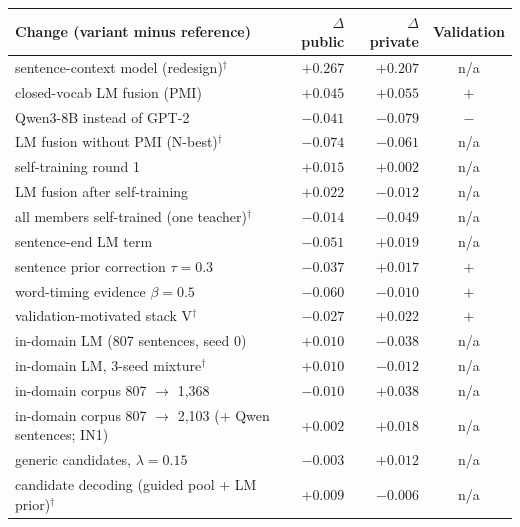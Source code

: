 \begin{tabular}{lrrc}
    \toprule
    Change (variant minus reference) & $\Delta$ public & $\Delta$ private & Validation \\
    \midrule
    sentence-context model (redesign)$^\dagger$ & $+0.267$ & $+0.207$ & n/a \\
    closed-vocab LM fusion (PMI) & $+0.045$ & $+0.055$ & $+$ \\
    Qwen3-8B instead of GPT-2 & $-0.041$ & $-0.079$ & $-$ \\
    LM fusion without PMI (N-best)$^\dagger$ & $-0.074$ & $-0.061$ & n/a \\
    \midrule
    self-training round 1 & $+0.015$ & $+0.002$ & n/a \\
    LM fusion after self-training & $+0.022$ & $-0.012$ & n/a \\
    all members self-trained (one teacher)$^\dagger$ & $-0.014$ & $-0.049$ & n/a \\
    sentence-end LM term & $-0.051$ & $+0.019$ & n/a \\
    sentence prior correction $\tau{=}0.3$ & $-0.037$ & $+0.017$ & $+$ \\
    word-timing evidence $\beta{=}0.5$ & $-0.060$ & $-0.010$ & $+$ \\
    validation-motivated stack V$^\dagger$ & $-0.027$ & $+0.022$ & $+$ \\
    \midrule
    in-domain LM (807 sentences, seed 0) & $+0.010$ & $-0.038$ & n/a \\
    in-domain LM, 3-seed mixture$^\dagger$ & $+0.010$ & $-0.012$ & n/a \\
    in-domain corpus 807 $\to$ 1,368 & $-0.010$ & $+0.038$ & n/a \\
    in-domain corpus 807 $\to$ 2,103 (+ Qwen sentences; IN1) & $+0.002$ & $+0.018$ & n/a \\
    generic candidates, $\lambda{=}0.15$ & $-0.003$ & $+0.012$ & n/a \\
    candidate decoding (guided pool + LM prior)$^\dagger$ & $+0.009$ & $-0.006$ & n/a \\
    \bottomrule
\end{tabular}
